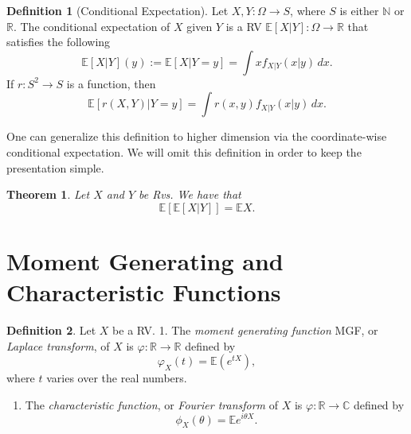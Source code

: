 \documentclass[
  openany]{book}
\providecommand{\tightlist}{%
  \setlength{\itemsep}{0pt}\setlength{\parskip}{0pt}}
\newtheorem{theorem}{Theorem}[chapter]
\theoremstyle{definition}
\newtheorem{definition}{Definition}[chapter]
\theoremstyle{definition}
\theoremstyle{definition}
\theoremstyle{definition}
\theoremstyle{remark}
\begin{document}
\begin{definition}[Conditional Expectation]
Let \(X,Y:\Omega \to S\), where \(S\) is either \(\mathbb{N}\) or \(\mathbb{R}\).
The conditional expectation of \(X\) given \(Y\) is a RV \(\mathbb{E}[X | Y] : \Omega \to \mathbb{R}\)
that satisfies the following
\[ \mathbb{E}[X | Y](y) := \mathbb{E}[X | Y = y] = \int x f_{X|Y}(x|y) \, dx . \]
If \(r:S^2 \to S\) is a function, then
\[ \mathbb{E}[r(X,Y) | Y = y] = \int r(x,y) f_{X|Y}(x|y) \, dx .\]
\end{definition}

One can generalize this definition to higher dimension via the coordinate-wise conditional
expectation. We will omit this definition in order to keep the presentation simple.

\begin{theorem}
Let \(X\) and \(Y\) be Rvs. We have that
\[ \mathbb{E}[ \mathbb{E}[X | Y]] = \mathbb{E}X. \]
\end{theorem}

\section{Moment Generating and Characteristic Functions}\label{moment-generating-and-characteristic-functions}

\begin{definition}

Let \(X\) be a RV.
1. The \emph{moment generating function} MGF, or \emph{Laplace transform}, of \(X\) is \(\varphi: \mathbb{R}\to \mathbb{R}\) defined by
\[ \varphi_X (t) = \mathbb{E}\left( e^{t X}  \right),  \]
where \(t\) varies over the real numbers.

\begin{enumerate}
\def\labelenumi{\arabic{enumi}.}
\setcounter{enumi}{1}
\tightlist
\item
  The \emph{characteristic function}, or \emph{Fourier transform} of \(X\) is \(\varphi: \mathbb{R}\to \mathbb{C}\) defined by
  \[\phi_X(\theta) = \mathbb{E}e^{i\theta X} .\]
\end{enumerate}

\end{definition}
\end{document}
